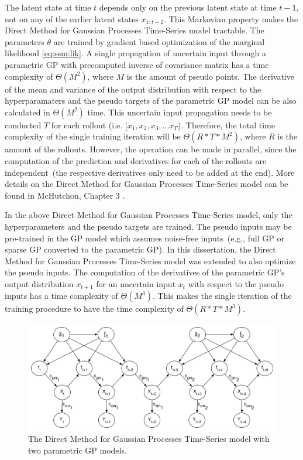 \noindent The latent state at time $t$ depends only on the previous latent state at time $t-1$, not on any of the earlier latent states $x_{1:t-2}$. This Markovian property makes the Direct Method for Gaussian Processes Time-Series model tractable. The parameters $\theta$ are trained by gradient based optimization of the marginal likelihood \ref{eq:ssm:lik}. A single propagation of uncertain input through a parametric GP with precomputed inverse of covariance matrix has a time complexity of $\Theta(M^2)$, where $M$ is the amount of pseudo points. The derivative of the mean and variance of the output distribution with respect to the hyperparamaters and the pseudo targets of the parametric GP model can be also calculated in $\Theta(M^2)$ time. This uncertain input propagation needs to be conducted ${T}$ for each rollout (i.e. $[x_{1},x_{2}, x_{3},...x_{T}$). Therefore, the total time complexity of the single training iteration will be $\Theta(R*T*M^2)$, where $R$ is the amount of the rollouts. However, the operation can be made in parallel, since the computation of the prediction and derivatives for each of the rollouts are independent\ (the respective derivatives only need to be added at the end). More details on the Direct Method for Gaussian Processes Time-Series model can be found in McHutchon, Chapter 3 \cite{mch-thesis}.

\noindent In the above Direct Method for Gaussian Processes Time-Series model, only the hyperparameters and the pseudo targets are trained. The pseudo inputs may be pre-trained in the GP model which assumes noise-free inputs\ (e.g., full GP or sparse GP converted to the parametric GP). In this dissertation, the Direct Method for Gaussian Processes Time-Series model was extended to also optimize the pseudo inputs. The computation of the derivatives of the parametric GP's output distribution $x_{t+1}$ for an uncertain input $x_{t}$ with respect to the pseudo inputs has a time complexity of $\Theta(M^3)$. This makes the single iteration of the training procedure to have the time complexity of $\Theta(R*T*M^3)$. 

\begin{figure}[H]
\centering
\includegraphics[width=1\textwidth, scale=1]{plots/ssm_models}
\caption{\label{fig:dtsm:twogps}The Direct Method for Gaussian Processes Time-Series model with two parametric GP models.}
\end{figure}

